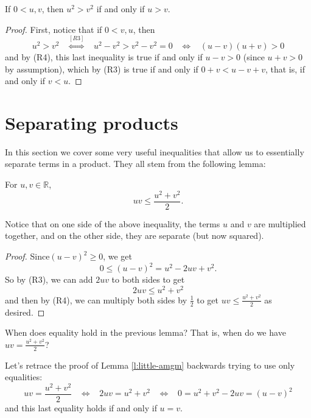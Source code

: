 \documentclass[11pt,dvipsnames]{book}
\numberwithin{figure}{section} %
\numberwithin{table}{section} %
\begin{document}
\begin{proposition}
\label{p:u^2>v^2}
If $0<u,v$, then $u^2>v^2$ if and only if $u>v$.
\end{proposition}

\begin{proof}
First, notice that if $0<v,u$, then
\[
u^2>v^2 \;\;\;   \stackrel{[R3]}{ \Longleftrightarrow} \;\;\;  u^2-v^2>v^2-v^2=0 \;\;\;  \Longleftrightarrow \;\;\;  (u-v)(u+v)>0
\]
and by (R4), this last inequality is true if and only if $u-v>0$ (since $u+v>0$ by assumption), which by (R3) is true if and only if $0+v<u-v+v$, that is, if and only if $v<u$.
\end{proof}

\section{Separating products}

In this section we cover some very useful inequalities that allow us to essentially separate terms in a product. They all stem from the following lemma:

\begin{lemma}
\label{l:little-amgm}
For $u,v\in\mathbb{R}$,
\[uv \leq \frac{u^2+v^2}{2}.\]
\end{lemma}
Notice that on one side of the above inequality, the terms $u$ and $v$ are multiplied together, and on the other side, they are separate (but now squared).

\begin{proof}
Since$(u-v)^2\geq 0$, we get
\[
0\leq (u-v)^2 =u^2-2uv + v^2.\]
So by (R3), we can add $2uv$ to both sides to get
\[
2uv \leq u^2+v^2\]
and then by (R4), we can multiply both sides by $\frac{1}{2}$ to get $uv \leq \frac{u^2+v^2}{2}$ as desired.
\end{proof}

\begin{exercise}
\label{ex:uv=u^2+v^2/2}
When does equality hold in the previous lemma? That is, when do we have $uv = \frac{u^2+v^2}{2}$?
\end{exercise}

\begin{solution}
Let's retrace the proof of  Lemma \ref{l:little-amgm} backwards trying to use only equalities:
\[
uv = \frac{u^2+v^2}{2} \;\;\; \Longleftrightarrow \;\;\; 2uv = u^2+v^2
 \;\;\; \Longleftrightarrow \;\;\; 0=u^2+v^2-2uv = (u-v)^{2}
 \]
 and this last equality holds if and only if $u=v$.
 \end{solution}
\end{document}
